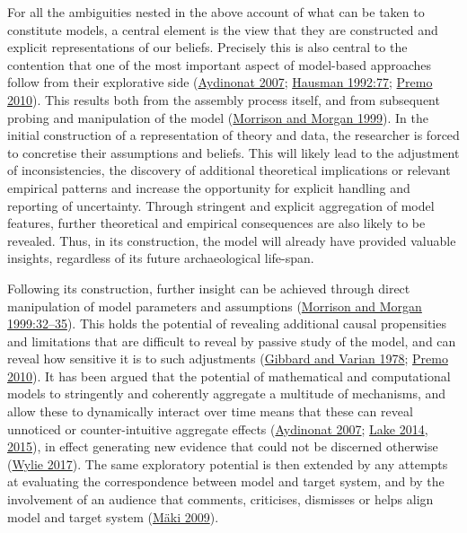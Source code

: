 \documentclass[
  12pt,
  a4paper,
  oneside]{book}
\begin{document}
For all the ambiguities nested in the above account of what can be taken to constitute models, a central element is the view that they are constructed and explicit representations of our beliefs. Precisely this is also central to the contention that one of the most important aspect of model-based approaches follow from their explorative side (\protect\hyperlink{ref-aydinonat2007}{Aydinonat 2007}; \protect\hyperlink{ref-hausman1992}{Hausman 1992:77}; \protect\hyperlink{ref-premo2010}{Premo 2010}). This results both from the assembly process itself, and from subsequent probing and manipulation of the model (\protect\hyperlink{ref-morrison1999}{Morrison and Morgan 1999}). In the initial construction of a representation of theory and data, the researcher is forced to concretise their assumptions and beliefs. This will likely lead to the adjustment of inconsistencies, the discovery of additional theoretical implications or relevant empirical patterns and increase the opportunity for explicit handling and reporting of uncertainty. Through stringent and explicit aggregation of model features, further theoretical and empirical consequences are also likely to be revealed. Thus, in its construction, the model will already have provided valuable insights, regardless of its future archaeological life-span.

Following its construction, further insight can be achieved through direct manipulation of model parameters and assumptions (\protect\hyperlink{ref-morrison1999}{Morrison and Morgan 1999:32--35}). This holds the potential of revealing additional causal propensities and limitations that are difficult to reveal by passive study of the model, and can reveal how sensitive it is to such adjustments (\protect\hyperlink{ref-gibbard1978}{Gibbard and Varian 1978}; \protect\hyperlink{ref-premo2010}{Premo 2010}). It has been argued that the potential of mathematical and computational models to stringently and coherently aggregate a multitude of mechanisms, and allow these to dynamically interact over time means that these can reveal unnoticed or counter-intuitive aggregate effects (\protect\hyperlink{ref-aydinonat2007}{Aydinonat 2007}; \protect\hyperlink{ref-lake2014}{Lake 2014}, \protect\hyperlink{ref-lake2015}{2015}), in effect generating new evidence that could not be discerned otherwise (\protect\hyperlink{ref-wylie2017}{Wylie 2017}). The same exploratory potential is then extended by any attempts at evaluating the correspondence between model and target system, and by the involvement of an audience that comments, criticises, dismisses or helps align model and target system (\protect\hyperlink{ref-muxe4ki2009}{Mäki 2009}).
\end{document}
